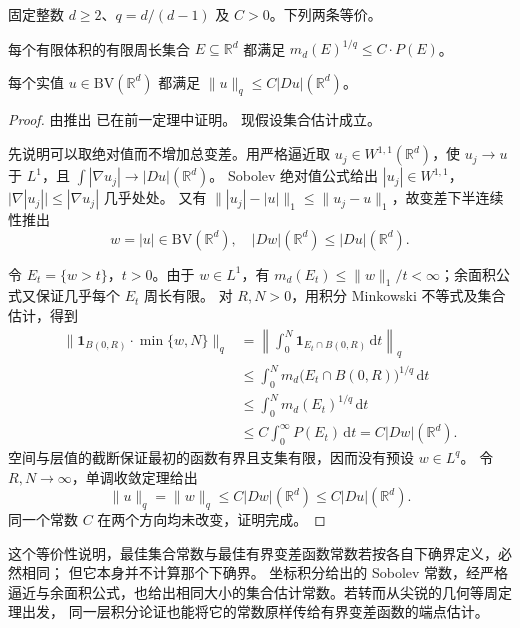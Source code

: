 \begin{proposition}[集合与函数估计的常数传递]\label{b1:prop:isoperimetric-sobolev-equivalence}
固定整数 \(d\ge2\)、\(q=d/(d-1)\) 及 \(C>0\)。下列两条等价。
\begin{equivalences}
 \item\label{b1:item:bv-isoperimetric-set-bound}
 每个有限体积的有限周长集合 \(E\subseteq\mathbb R^d\) 都满足
 \(m_d(E)^{1/q}\le C\cdot P(E)\)。
 \item\label{b1:item:bv-isoperimetric-function-bound}
 每个实值 \(u\in \mathrm{BV}(\mathbb R^d)\) 都满足
 \(\|u\|_q\le C|Du|(\mathbb R^d)\)。
\end{equivalences}
\end{proposition}
\begin{proof}
由推出%
已在前一定理中证明。
现假设集合估计成立。

先说明可以取绝对值而不增加总变差。用严格逼近取
\(u_j\in W^{1,1}(\mathbb R^d)\)，使 \(u_j\to u\) 于 \(L^1\)，且
\(\int|\nabla u_j|\to|Du|(\mathbb R^d)\)。
Sobolev 绝对值公式给出 \(|u_j|\in W^{1,1}\)，
\(\bigl|\nabla|u_j|\bigr|\le|\nabla u_j|\) 几乎处处。
又有 \(\||u_j|-|u|\|_1\le\|u_j-u\|_1\)，故变差下半连续性推出
\[
 w=|u|\in \mathrm{BV}(\mathbb R^d),\quad
 |Dw|(\mathbb R^d)\le|Du|(\mathbb R^d).
\]

令 \(E_t=\{w>t\}\)，\(t>0\)。由于 \(w\in L^1\)，有
\(m_d(E_t)\le\|w\|_1/t<\infty\)；余面积公式又保证几乎每个 \(E_t\) 周长有限。
对 \(R,N>0\)，用积分 Minkowski 不等式及集合估计，得到
\[
 \begin{aligned}
 \|\mathbf1_{B(0,R)}\cdot\min\{w,N\}\|_q
 &=\left\|\int_0^N\mathbf1_{E_t\cap B(0,R)}\,\mathrm dt\right\|_q\\
 &\le\int_0^N m_d\bigl(E_t\cap B(0,R)\bigr)^{1/q}\,\mathrm dt\\
 &\le\int_0^N m_d(E_t)^{1/q}\,\mathrm dt\\
 &\le C\int_0^\infty P(E_t)\,\mathrm dt
   =C|Dw|(\mathbb R^d).
 \end{aligned}
\]
空间与层值的截断保证最初的函数有界且支集有限，因而没有预设 \(w\in L^q\)。
令 \(R,N\to\infty\)，单调收敛定理给出
\[
 \|u\|_q=\|w\|_q\le C|Dw|(\mathbb R^d)\le C|Du|(\mathbb R^d).
\]
同一个常数 \(C\) 在两个方向均未改变，证明完成。
\end{proof}

这个等价性说明，最佳集合常数与最佳有界变差函数常数若按各自下确界定义，必然相同；
但它本身并不计算那个下确界。
坐标积分给出的 Sobolev 常数，经严格逼近与余面积公式，也给出相同大小的集合估计常数。若转而从尖锐的几何等周定理出发，
同一层积分论证也能将它的常数原样传给有界变差函数的端点估计。
